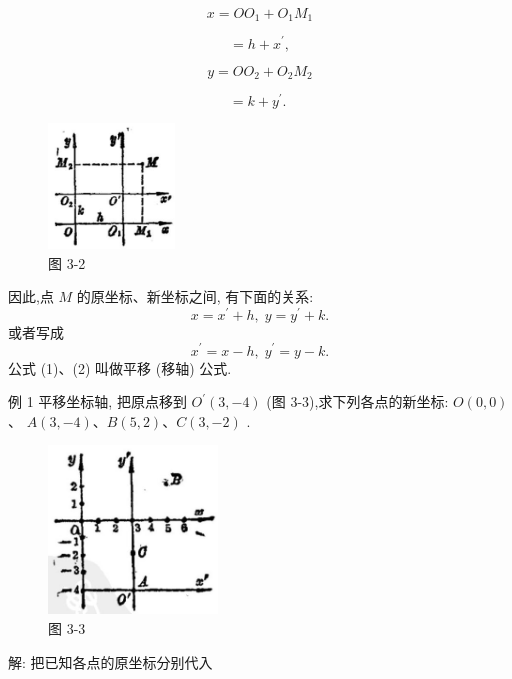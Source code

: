 \documentclass[lang=cn,newtx,10.5pt,scheme=chinese]{elegantbook}
\begin{document}
\[
  x = O{O}_{1} + {O}_{1}{M}_{1}
\]

\[
  = h + {x}^{\prime },
\]

\[
  y = O{O}_{2} + {O}_{2}{M}_{2}
\]

\[
  = k + {y}^{\prime }\text{. }
\]

\begin{figure}[h]
  \centering
  \includegraphics[max width=0.3\textwidth]{images/01912cc2-ffb6-728e-9ae7-b113ff05c64b_134_803889.jpg}
  \caption{图 3-2}
\end{figure}


\begin{corollary}[平移 (移轴) 公式]
因此,点 \(M\) 的原坐标、新坐标之间, 有下面的关系:
\[
  x = {x}^{\prime } + h,\;y = {y}^{\prime } + k. \tag{1}
\]
或者写成
\[
    {x}^{\prime } = x - h,\;{y}^{\prime } = y - k. \tag{2}
\]
公式 (1)、(2) 叫做平移 (移轴) 公式.
\end{corollary}

例 1 平移坐标轴, 把原点移到 \({O}^{\prime }\left( {3, - 4}\right)\) (图 3-3),求下列各点的新坐标: \(O\left( {0,0}\right)\) 、 \(A\left( {3, - 4}\right) \text{、}B\left( {5,2}\right) \text{、}C\left( {3, - 2}\right)\) .

\begin{figure}[h]
  \centering
  \includegraphics[max width=0.4\textwidth]{images/01912cc2-ffb6-728e-9ae7-b113ff05c64b_134_527625.jpg}
  \caption{图 3-3}
\end{figure}



解: 把已知各点的原坐标分别代入
\end{document}

